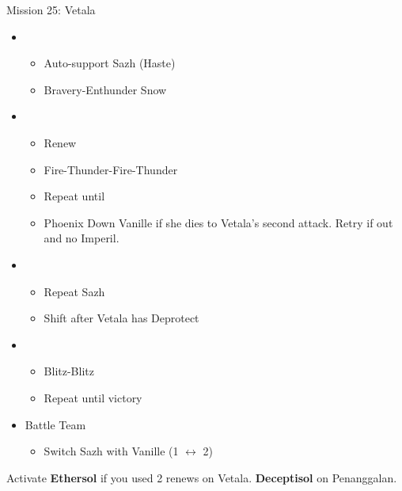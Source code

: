\begin{multicols}{2}
\begin{battle}[0:38]{Mission 25: Vetala}
\begin{itemize}
      \item \first
            \begin{itemize}
              \item Auto-support Sazh (Haste)
              \item Bravery-Enthunder Snow
            \end{itemize}
      \item \fifth
            \begin{itemize}
              \item Renew
              \item Fire-Thunder-Fire-Thunder
              \item Repeat until \stagger
              \item Phoenix Down Vanille if she dies to Vetala's second attack. Retry if out and no Imperil.
            \end{itemize}
            \columnbreak
      \item \first
            \begin{itemize}
              \item Repeat Sazh
              \item Shift after Vetala has Deprotect
            \end{itemize}
      \item \fourth
            \begin{itemize}
              \item Blitz-Blitz
              \item Repeat until victory
            \end{itemize}
    \end{itemize}
  \end{battle}
  \begin{menu}
    \begin{itemize}
      \paradigm
      \begin{itemize}
        \item {}%
              {\paradigmline{\syn}{(\rav)}{(\sen)}}%
              {\paradigmline[2]{\textit{\com}}{\textit{\rav}}{\textit{\rav}}}%
              {\paradigmline{(\rav)}{(\rav)}{(\sen)}}%
              {\paradigmline{\com}{(\rav)}{\com}}%
              {\paradigmline{\rav}{\sab}{(\sen)}}%
              {\paradigmline{\com}{\rav}{\com}}
      \end{itemize}
      \item Battle Team
            \begin{itemize}
              \item Switch Sazh with Vanille (1 $\leftrightarrow$ 2)
            \end{itemize}
    \end{itemize}
  \end{menu}
   Activate \textbf{Ethersol} if you used 2 renews on Vetala. \textbf{Deceptisol} on Penanggalan.
  \renewcommand{\second}{[2] Relentless Assault (\rav/\rav/\com)}
  \renewcommand{\third}{[3] Mystic Tower (\rav/\rav/\sen)}


\end{multicols}
